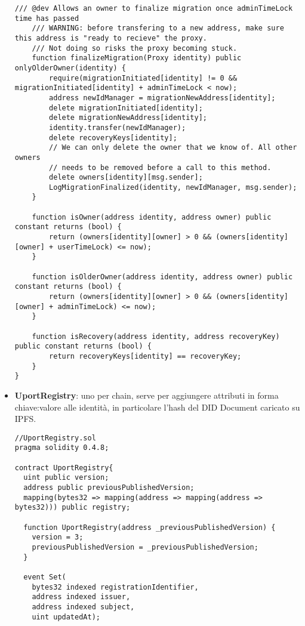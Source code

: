 \begin{itemize}
\begin{lstlisting}[language=Solidity]
    /// @dev Allows an owner to finalize migration once adminTimeLock time has passed
    /// WARNING: before transfering to a new address, make sure this address is "ready to recieve" the proxy.
    /// Not doing so risks the proxy becoming stuck.
    function finalizeMigration(Proxy identity) public onlyOlderOwner(identity) {
        require(migrationInitiated[identity] != 0 && migrationInitiated[identity] + adminTimeLock < now);
        address newIdManager = migrationNewAddress[identity];
        delete migrationInitiated[identity];
        delete migrationNewAddress[identity];
        identity.transfer(newIdManager);
        delete recoveryKeys[identity];
        // We can only delete the owner that we know of. All other owners
        // needs to be removed before a call to this method.
        delete owners[identity][msg.sender];
        LogMigrationFinalized(identity, newIdManager, msg.sender);
    }

    function isOwner(address identity, address owner) public constant returns (bool) {
        return (owners[identity][owner] > 0 && (owners[identity][owner] + userTimeLock) <= now);
    }

    function isOlderOwner(address identity, address owner) public constant returns (bool) {
        return (owners[identity][owner] > 0 && (owners[identity][owner] + adminTimeLock) <= now);
    }

    function isRecovery(address identity, address recoveryKey) public constant returns (bool) {
        return recoveryKeys[identity] == recoveryKey;
    }
}
  \end{lstlisting}

  \item \textbf{UportRegistry}: uno per chain, serve per aggiungere attributi in forma chiave:valore alle identità,
  in particolare l’hash del DID Document caricato su IPFS.
  
  \begin{lstlisting}[language=Solidity]
//UportRegistry.sol
pragma solidity 0.4.8;

contract UportRegistry{
  uint public version;
  address public previousPublishedVersion;
  mapping(bytes32 => mapping(address => mapping(address => bytes32))) public registry;

  function UportRegistry(address _previousPublishedVersion) {
    version = 3;
    previousPublishedVersion = _previousPublishedVersion;
  }

  event Set(
    bytes32 indexed registrationIdentifier,
    address indexed issuer,
    address indexed subject,
    uint updatedAt);


\end{lstlisting}
\end{itemize}
